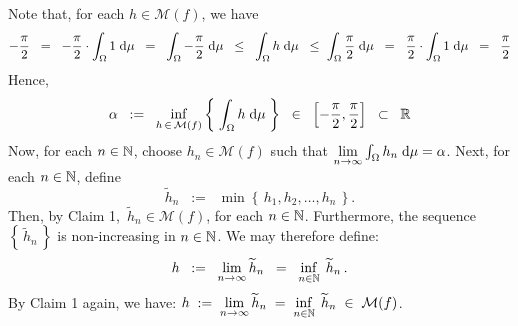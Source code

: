 
\vskip 0.8cm
\noindent
Note that, for each $h \in \mathcal{M}(f)$, we have
\begin{equation*}
-\dfrac{\pi}{2}
\;\;=\;\; -\dfrac{\pi}{2} \cdot \int_{\Omega} 1\;\textnormal{d}\mu
\;\;=\;\; \int_{\Omega} -\dfrac{\pi}{2} \;\textnormal{d}\mu
\;\;\leq\;\; \int_{\Omega} h \;\textnormal{d}\mu
\;\;\leq\; \int_{\Omega} \dfrac{\pi}{2} \;\textnormal{d}\mu
\;\;=\;\; \dfrac{\pi}{2} \cdot \int_{\Omega} 1\;\textnormal{d}\mu
\;\;=\;\; \dfrac{\pi}{2}
\end{equation*}
Hence,
\begin{equation*}
\alpha
\;\; := \;\; \underset{h\,\in\,\mathcal{M}(f)}{\inf}\left\{\;\int_{\Omega}h\;\textnormal{d}\mu\;\right\}
\;\;\in\;\; \left[-\dfrac{\pi}{2},\dfrac{\pi}{2}\right]
\;\;\subset\;\; \mathbb{R}
\end{equation*}
Now, for each $n \in \mathbb{N}$, choose $h_{n} \in \mathcal{M}(f)$ such that
$\underset{n\rightarrow\infty}{\lim}\int_{\Omega}h_{n}\;\textnormal{d}\mu = \alpha$.
Next, for each $n \in \mathbb{N}$, define
\begin{equation*}
\widetilde{h}_{n} \;\; := \;\; \min\!\left\{\,h_{1},h_{2},\ldots,h_{n}\,\right\}.
\end{equation*}
Then, by Claim 1, \,$\widetilde{h}_{n} \in \mathcal{M}(f)$, for each $n \in \mathbb{N}$.
Furthermore, the sequence $\left\{\,\widetilde{h}_{n}\,\right\}$ is non-increasing in $n \in \mathbb{N}$.
We may therefore define:
\begin{equation*}
h
\;\; := \;\; \underset{n\rightarrow\infty}{\lim}\,\widetilde{h}_{n}
\;\; = \;\; \underset{n\in\mathbb{N}}{\inf}\;\,\widetilde{h}_{n}\,.
\end{equation*}
By Claim 1 again, we have:
$h \; := \; \underset{n\rightarrow\infty}{\lim}\,\widetilde{h}_{n} \; = \; \underset{n\in\mathbb{N}}{\inf}\;\,\widetilde{h}_{n} \; \in \; \mathcal{M}(f)$.

